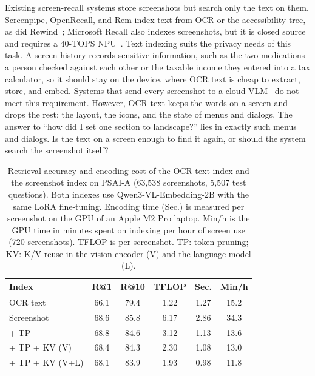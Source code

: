 Existing screen-recall systems store screenshots but search only the text on
them. Screenpipe, OpenRecall, and Rem index text from OCR or the
accessibility tree, as did Rewind~; Microsoft Recall also indexes screenshots, but it is closed source
and requires a 40-TOPS NPU~. Text indexing suits
the privacy needs of this task. A screen history records sensitive
information, such as the two medications a person checked against each other
or the taxable income they entered into a tax calculator, so it should stay
on the device, where OCR text is cheap to extract, store, and embed. Systems
that send every screenshot to a cloud VLM~\cite{wang2025mirix} do not meet
this requirement. However, OCR text keeps the words on a screen and drops
the rest: the layout, the icons, and the state of menus and dialogs. The
answer to ``how did I set one section to landscape?'' lies in exactly such
menus and dialogs. Is the text on a screen enough to find it again, or should
the system search the screenshot itself?

\begin{table}[t]
\caption{Retrieval accuracy and encoding cost of the OCR-text index and the
screenshot index on PSAI-A (63,538 screenshots, 5,507 test questions). Both
indexes use Qwen3-VL-Embedding-2B with the same LoRA fine-tuning. Encoding
time (Sec.) is measured per screenshot on the GPU of an Apple M2 Pro laptop.
Min/h is the GPU time in minutes spent on indexing per hour of screen use
(720 screenshots). TFLOP is per screenshot. TP: token pruning; KV: K/V reuse
in the vision encoder (V) and the language model (L).}
\label{tab:intro}
\vskip 0.1in
\begin{center}
\begin{small}
\setlength{\tabcolsep}{4pt}
\begin{tabular}{lccccc}
\toprule
Index & R@1 & R@10 & TFLOP & Sec. & Min/h \\
\midrule
OCR text              & 66.1 & 79.4 & 1.22 & 1.27 & 15.2 \\
Screenshot            & 68.6 & 85.8 & 6.17 & 2.86 & 34.3 \\
\quad + TP            & 68.8 & 84.6 & 3.12 & 1.13 & 13.6 \\
\quad + TP + KV (V)   & 68.4 & 84.3 & 2.30 & 1.08 & 13.0 \\
\quad + TP + KV (V+L) & 68.1 & 83.9 & 1.93 & 0.98 & 11.8 \\
\bottomrule
\end{tabular}
\end{small}
\end{center}
\vskip -0.1in
\end{table}

